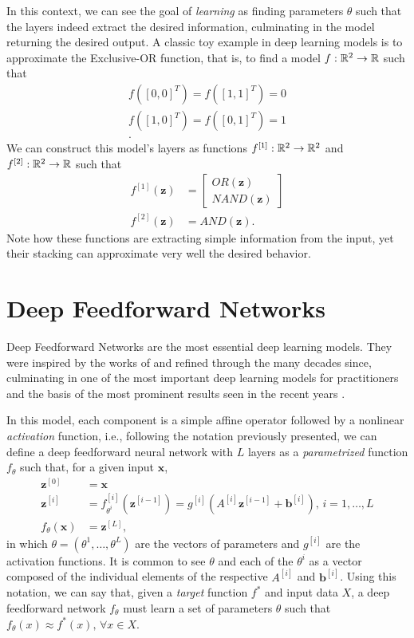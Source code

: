 In this context, we can see the goal of \textit{learning} as finding parameters $\theta$ such that the layers indeed extract the desired information, culminating in the model returning the desired output.
A classic toy example in deep learning models is to approximate the Exclusive-OR function, that is, to find a model $f : \mathbb{R}^2 \to \mathbb{R}$ such that
\begin{align*}
    f([0,0]^T) = f([1,1]^T) = 0 \\
    f([1,0]^T) = f([0,1]^T) = 1 \\
.\end{align*}
We can construct this model's layers as functions $f^{[1]}:\mathbb{R}^2\to\mathbb{R}^2$ and $f^{[2]}:\mathbb{R}^2\to\mathbb{R}$ such that
\begin{align*}
    f^{[1]}(\bm{z}) &= \begin{bmatrix}
    OR(\bm{z}) \\
    NAND(\bm{z})
    \end{bmatrix} \\
    f^{[2]}(\bm{z}) &= AND(\bm{z})
.\end{align*}
Note how these functions are extracting simple information from the input, yet their stacking can approximate very well the desired behavior.

\section{Deep Feedforward Networks}\label{sec:neural-nets}

Deep Feedforward Networks are the most essential deep learning models.
They were inspired by the works of \textcite{rosenblatt_perceptron_1957} and refined through the many decades since, culminating in one of the most important deep learning models for practitioners and the basis of the most prominent results seen in the recent years \cite{goodfellow_deep_2016}.

In this model, each component is a simple affine operator followed by a nonlinear \textit{activation} function, i.e., following the notation previously presented, we can define a deep feedforward neural network with $L$ layers as a \textit{parametrized} function $f_\theta$ such that, for a given input $\bm{x}$,
\begin{align*}
    \bm{z}^{[0]} &= \bm{x} \\
    \bm{z}^{[i]} &= f_{\theta^i}^{[i]}(\bm{z}^{[i-1]}) = g^{[i]}\left(A^{[i]}\bm{z}^{[i-1]} + \bm{b}^{[i]}\right) ,\,i=1,\ldots,L \\
    f_\theta(\bm{x}) &= \bm{z}^{[L]}
,\end{align*}
in which $\theta=\left( \theta^1,\ldots,\theta^L \right) $ are the vectors of parameters and $g^{[i]}$ are the activation functions. It is common to see $\theta$ and each of the $\theta^i$ as a vector composed of the individual elements of the respective $A^{[i]}$ and $\bm{b}^{[i]}$. Using this notation, we can say that, given a \textit{target} function $f^*$ and input data $X$, a deep feedforward network $f_\theta$ must learn a set of parameters $\theta$ such that $f_\theta(x) \approx f^*(x),\,\forall x \in X$.

